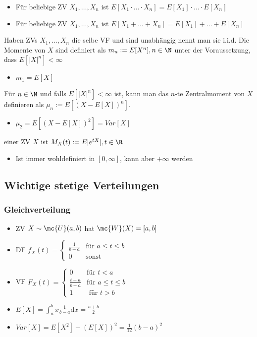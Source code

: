 \begin{itemize}
\begin{itemize}
            \item Für beliebige ZV $X_1, \dots, X_n$ ist $E[X_1 \cdot \dots \cdot X_n] = E[X_1] \cdot \dots \cdot E[X_n]$
            \item Für beliebige ZV $X_1, \dots, X_n$ ist $E[X_1 + \dots + X_n] = E[X_1] + \dots + E[X_n]$
        \end{itemize}
     Haben ZVs $X_1, \dots, X_n$ die selbe VF und sind unabhängig nennt man sie i.i.d.
     Die Momente von $X$ sind definiert als $m_n := E[X^n], n \in \N$ unter der Voraussetzung, dass $E[|X|^n] < \infty$
        \begin{itemize}
            \item $m_1 = E[X]$
        \end{itemize}
     Für $n \in \N$ und falls $E[|X|^n] < \infty$ ist, kann man das $n$-te Zentralmoment von $X$ definieren als $\mu_n := E[(X - E[X])^n]$.
        \begin{itemize}
            \item $\mu_2 = E[(X - E[X])^2] = Var[X]$
        \end{itemize}
     einer ZV $X$ ist $M_X(t) := E[e^{tX}], t \in \R$
        \begin{itemize}
            \item Ist immer wohldefiniert in $[0, \infty]$, kann aber $+\infty$ werden
        \end{itemize}
\end{itemize}

\subsection{Wichtige stetige Verteilungen}
\subsubsection{Gleichverteilung}
\begin{itemize}
    \item ZV $X \sim \mc{U}(a,b)$ hat $\mc{W}(X) = [a,b]$
    \item DF $f_X(t) =
\begin{cases}
    \frac{1}{b - a} &\text{für } a \le t \le b\\
    0 & \text{sonst}
\end{cases}$
    \item VF $F_X(t) =
\begin{cases}
    0 &\text{für } t < a\\
    \frac{t - a}{b - a} &\text{für } a \le t \le b\\
    1 &\text{ für } t > b
\end{cases}$
    \item $E[X] = \int_{a}^{b} x \frac{1}{b - a} \mathrm{d}x = \frac{a + b}{2}$
    \item $Var[X] = E[X^2] - (E[X])^2 = \frac{1}{12}(b - a)^2$
\end{itemize}

